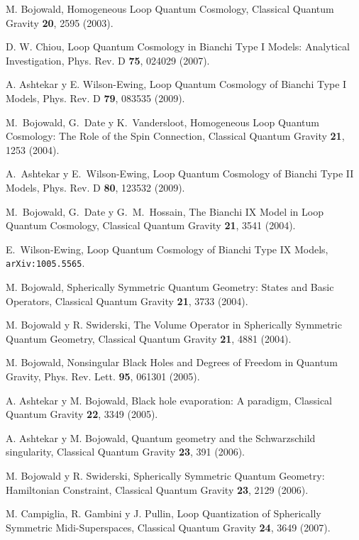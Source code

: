 \begin{thebibliography}{999}

 M. Bojowald, Homogeneous Loop Quantum Cosmology, Classical Quantum Gravity {\bf 20},
2595 (2003).

 D. W. Chiou, Loop Quantum Cosmology in Bianchi Type I Models: Analytical
Investigation, Phys. Rev. D {\bf 75}, 024029 (2007).

 A. Ashtekar y E. Wilson-Ewing, Loop Quantum Cosmology of Bianchi Type I Models,
Phys. Rev. D {\bf 79}, 083535 (2009).

 M.~Bojowald, G.~Date y K.~Vandersloot, {Homogeneous
Loop Quantum Cosmology: The Role of the Spin Connection}, Classical
Quantum Gravity \textbf{21}, 1253 (2004).

 A.~Ashtekar y E.~Wilson-Ewing, {Loop Quantum
Cosmology of Bianchi Type II Models}, Phys. Rev. D \textbf{80},
123532 (2009).

 M.~Bojowald, G.~Date y G.~M.~Hossain, {The Bianchi
IX Model in Loop Quantum Cosmology}, Classical
Quantum Gravity \textbf{21}, 3541 (2004).

 E.~Wilson-Ewing, {Loop Quantum Cosmology of Bianchi Type
IX Models}, \texttt{arXiv:1005.5565}.

 M. Bojowald, Spherically Symmetric Quantum Geometry: States and Basic
Operators, Classical Quantum Gravity {\bf21}, 3733 (2004). 

 M. Bojowald y R. Swiderski, The Volume Operator in Spherically Symmetric Quantum
Geometry, Classical Quantum Gravity {\bf 21}, 4881 (2004).

 M. Bojowald, Nonsingular Black Holes and Degrees of Freedom in Quantum
Gravity, Phys. Rev. Lett. {\bf95}, 061301 (2005).

 A. Ashtekar y M. Bojowald, Black hole evaporation: A paradigm,
Classical Quantum Gravity {\bf22}, 3349 (2005). 

 A. Ashtekar y M. Bojowald, Quantum geometry and the Schwarzschild
singularity, Classical Quantum Gravity {\bf23}, 391 (2006).

 M. Bojowald y R. Swiderski, Spherically Symmetric Quantum Geometry: Hamiltonian
Constraint, Classical Quantum Gravity {\bf 23}, 2129 (2006).

 M. Campiglia, R. Gambini y J. Pullin, Loop Quantization of Spherically Symmetric
Midi-Superspaces, Classical Quantum Gravity {\bf24}, 3649 (2007).


\end{thebibliography}
